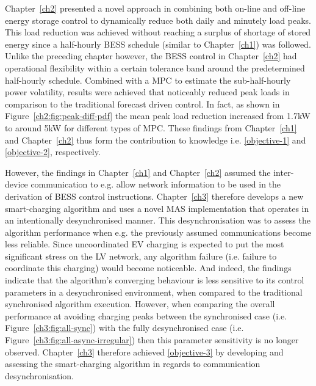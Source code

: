 Chapter~\ref{ch2} presented a novel approach in combining both on-line and off-line energy storage control to dynamically reduce both daily and minutely load peaks.
This load reduction was achieved without reaching a surplus of shortage of stored energy since a half-hourly BESS schedule (similar to Chapter~\ref{ch1}) was followed.
Unlike the preceding chapter however, the BESS control in Chapter~\ref{ch2} had operational flexibility within a certain tolerance band around the predetermined half-hourly schedule.
Combined with a MPC to estimate the sub-half-hourly power volatility, results were achieved that noticeably reduced peak loads in comparison to the traditional forecast driven control.
In fact, as shown in Figure~\ref{ch2:fig:peak-diff-pdf} the mean peak load reduction increased from 1.7kW to around 5kW for different types of MPC.
These findings from Chapter~\ref{ch1} and Chapter~\ref{ch2} thus form the contribution to knowledge i.e. \ref{objective-1} and \ref{objective-2}, respectively.

However, the findings in Chapter~\ref{ch1} and Chapter~\ref{ch2} assumed the inter-device communication to e.g. allow network information to be used in the derivation of BESS control instructions.
Chapter~\ref{ch3} therefore develops a new smart-charging algorithm and uses a novel MAS implementation that operates in an intentionally desynchronised manner.
This desynchronisation was to assess the algorithm performance when e.g. the previously assumed communications become less reliable.
Since uncoordinated EV charging is expected to put the most significant stress on the LV network, any algorithm failure (i.e. failure to coordinate this charging) would become noticeable.
And indeed, the findings indicate that the algorithm's converging behaviour is less sensitive to its control parameters in a desynchronised environment, when compared to the traditional synchronised algorithm execution.
However, when comparing the overall performance at avoiding charging peaks between the synchronised case (i.e. Figure~\ref{ch3:fig:all-sync}) with the fully desynchronised case (i.e. Figure~\ref{ch3:fig:all-async-irregular}) then this parameter sensitivity is no longer observed.
Chapter~\ref{ch3} therefore achieved \ref{objective-3} by developing and assessing the smart-charging algorithm in regards to communication desynchronisation.

